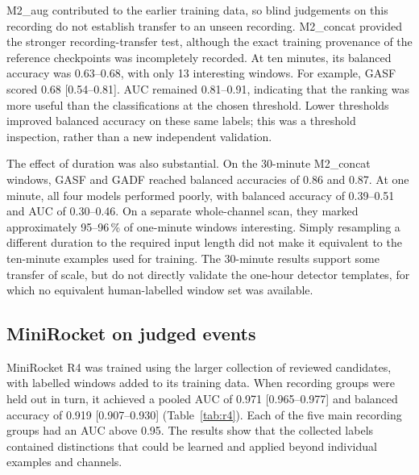 M2\_aug contributed to the earlier training data, so blind judgements on this recording do not establish transfer to an unseen recording. M2\_concat provided the stronger recording-transfer test, although the exact training provenance of the reference checkpoints was incompletely recorded. At ten minutes, its balanced accuracy was 0.63--0.68, with only 13 interesting windows. For example, GASF scored 0.68 [0.54--0.81]. AUC remained 0.81--0.91, indicating that the ranking was more useful than the classifications at the chosen threshold. Lower thresholds improved balanced accuracy on these same labels; this was a threshold inspection, rather than a new independent validation.

The effect of duration was also substantial. On the 30-minute M2\_concat windows, GASF and GADF reached balanced accuracies of 0.86 and 0.87. At one minute, all four models performed poorly, with balanced accuracy of 0.39--0.51 and AUC of 0.30--0.46. On a separate whole-channel scan, they marked approximately 95--96\,\% of one-minute windows interesting. Simply resampling a different duration to the required input length did not make it equivalent to the ten-minute examples used for training. The 30-minute results support some transfer of scale, but do not directly validate the one-hour detector templates, for which no equivalent human-labelled window set was available.


\subsection{MiniRocket on judged events}

MiniRocket R4 was trained using the larger collection of reviewed candidates, with labelled windows added to its training data. When recording groups were held out in turn, it achieved a pooled AUC of 0.971 [0.965--0.977] and balanced accuracy of 0.919 [0.907--0.930] (Table~\ref{tab:r4}). Each of the five main recording groups had an AUC above 0.95. The results show that the collected labels contained distinctions that could be learned and applied beyond individual examples and channels.

